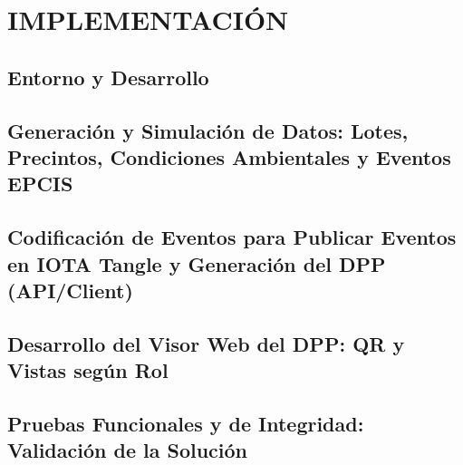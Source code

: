 \chapter{IMPLEMENTACIÓN}\label{ch:implementacion}

\section{Entorno y Desarrollo}\label{sec:implementacion-entorno}

\section{Generación y Simulación de Datos: Lotes, Precintos, Condiciones Ambientales y Eventos EPCIS}\label{sec:implementacion-generacion}

\section{Codificación de Eventos para Publicar Eventos en IOTA Tangle y Generación del DPP (API/Client)}\label{sec:implementacion-codificacion}

\section{Desarrollo del Visor Web del DPP: QR y Vistas según Rol}\label{sec:implementacion-desarrollo}

\section{Pruebas Funcionales y de Integridad: Validación de la Solución}\label{sec:implementacion-pruebas}
